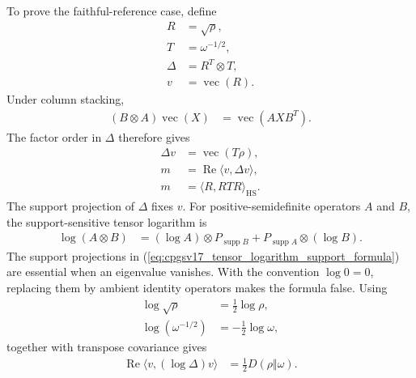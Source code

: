 \documentclass[11pt]{article}
\begin{document}
To prove the faithful-reference case, define
\begin{align}
    R
        &= \sqrt{\rho},
    \label{eq:cpgsv17_relative_modular_square_root}\\
    T
        &= \omega^{-1/2},
    \label{eq:cpgsv17_relative_modular_inverse_weight}\\
    \Delta
        &= R^T\otimes T,
    \label{eq:cpgsv17_relative_modular_operator}\\
    v
        &= \operatorname{vec}(R).
    \label{eq:cpgsv17_relative_modular_vector}
\end{align}
Under column stacking,
\begin{align}
    (B\otimes A)\operatorname{vec}(X)
        &= \operatorname{vec}(AXB^T).
    \label{eq:cpgsv17_vectorization_identity}
\end{align}
The factor order in $\Delta$ therefore gives
\begin{align}
    \Delta v
        &= \operatorname{vec}(T\rho),
    \label{eq:cpgsv17_relative_modular_action}\\
    m
        &= \operatorname{Re}\langle v,\Delta v\rangle,
    \label{eq:cpgsv17_relative_modular_half_moment}\\
    m
        &= \langle R,RTR\rangle_{\mathrm{HS}}.
    \label{eq:cpgsv17_half_moment_hilbert_schmidt_form}
\end{align}
The support projection of $\Delta$ fixes $v$. For positive-semidefinite
operators $A$ and $B$, the support-sensitive tensor logarithm is
\begin{align}
    \log(A\otimes B)
        &=
        (\log A)\otimes P_{\operatorname{supp}B}
        +
        P_{\operatorname{supp}A}\otimes(\log B).
    \label{eq:cpgsv17_tensor_logarithm_support_formula}
\end{align}
The support projections in
(\ref{eq:cpgsv17_tensor_logarithm_support_formula}) are essential when an
eigenvalue vanishes. With the convention $\log 0=0$, replacing them by
ambient identity operators makes the formula false. Using
\begin{align}
    \log\sqrt{\rho}
        &= \frac12\log\rho,
    \label{eq:cpgsv17_logarithm_square_root}\\
    \log(\omega^{-1/2})
        &= -\frac12\log\omega,
    \label{eq:cpgsv17_logarithm_inverse_square_root}
\end{align}
together with transpose covariance gives
\begin{align}
    \operatorname{Re}\langle v,(\log\Delta)v\rangle
        &= \frac12D(\rho\Vert\omega).
    \label{eq:cpgsv17_log_modular_relative_entropy}
\end{align}
\end{document}
